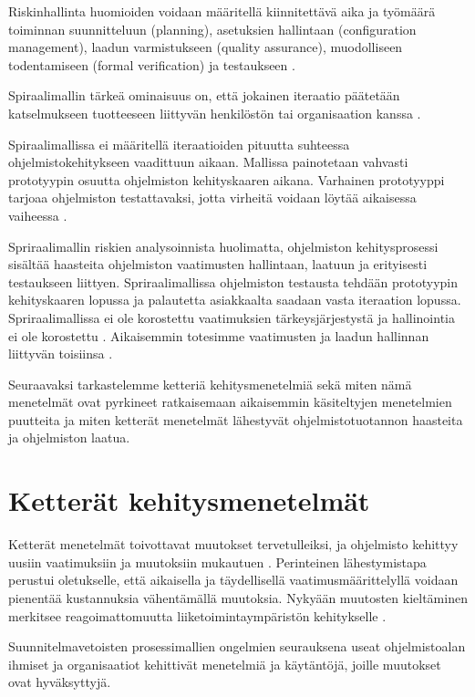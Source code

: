 \documentclass[finnish]{tktltiki2}
\theoremstyle{definition}
\theoremstyle{remark}
\begin{document}
Riskinhallinta huomioiden voidaan määritellä kiinnitettävä aika ja työmäärä toiminnan suunnitteluun (planning), asetuksien hallintaan (configuration management), laadun varmistukseen (quality assurance), muodolliseen todentamiseen (formal verification) ja testaukseen \cite{BOE88}.

Spiraalimallin tärkeä ominaisuus on, että jokainen iteraatio päätetään katselmukseen tuotteeseen liittyvän henkilöstön tai organisaation kanssa \cite{BOE88}.


Spiraalimallissa ei määritellä iteraatioiden pituutta suhteessa ohjelmistokehitykseen vaadittuun aikaan. Mallissa painotetaan vahvasti prototyypin osuutta ohjelmiston kehityskaaren aikana. Varhainen prototyyppi tarjoaa ohjelmiston testattavaksi, jotta virheitä voidaan löytää aikaisessa vaiheessa \cite{BOE88}.

Spriraalimallin riskien analysoinnista huolimatta, ohjelmiston kehitysprosessi sisältää haasteita ohjelmiston vaatimusten hallintaan, laatuun ja erityisesti testaukseen liittyen. Spriraalimallissa ohjelmiston testausta tehdään prototyypin kehityskaaren lopussa ja palautetta asiakkaalta saadaan vasta iteraation lopussa. Spriraalimallissa ei ole korostettu vaatimuksien tärkeysjärjestystä ja hallinointia ei ole korostettu \cite{BOE88}. Aikaisemmin totesimme vaatimusten ja laadun hallinnan liittyvän toisiinsa \cite{KIP96}. 

Seuraavaksi tarkastelemme ketteriä kehitysmenetelmiä sekä miten nämä menetelmät ovat pyrkineet ratkaisemaan aikaisemmin käsiteltyjen menetelmien puutteita ja miten ketterät menetelmät lähestyvät ohjelmistotuotannon haasteita ja ohjelmiston laatua. 

\section{Ketterät kehitysmenetelmät}

Ketterät menetelmät toivottavat muutokset tervetulleiksi, ja ohjelmisto kehittyy uusiin vaatimuksiin ja muutoksiin mukautuen \cite{WIC03}. Perinteinen lähestymistapa perustui oletukselle, että aikaisella ja täydellisellä vaatimusmäärittelyllä voidaan pienentää kustannuksia vähentämällä muutoksia. Nykyään muutosten kieltäminen merkitsee reagoimattomuutta liiketoimintaympäristön kehitykselle \cite{HIC01}.

Suunnitelmavetoisten prosessimallien ongelmien seurauksena useat ohjelmistoalan ihmiset ja organisaatiot kehittivät menetelmiä ja käytäntöjä, joille muutokset ovat hyväksyttyjä. 
\end{document}

